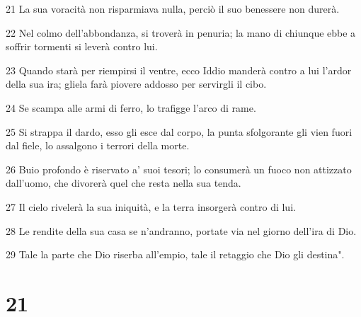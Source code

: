 \par 21 La sua voracità non risparmiava nulla, perciò il suo benessere non durerà.
\par 22 Nel colmo dell'abbondanza, si troverà in penuria; la mano di chiunque ebbe a soffrir tormenti si leverà contro lui.
\par 23 Quando starà per riempirsi il ventre, ecco Iddio manderà contro a lui l'ardor della sua ira; gliela farà piovere addosso per servirgli il cibo.
\par 24 Se scampa alle armi di ferro, lo trafigge l'arco di rame.
\par 25 Si strappa il dardo, esso gli esce dal corpo, la punta sfolgorante gli vien fuori dal fiele, lo assalgono i terrori della morte.
\par 26 Buio profondo è riservato a' suoi tesori; lo consumerà un fuoco non attizzato dall'uomo, che divorerà quel che resta nella sua tenda.
\par 27 Il cielo rivelerà la sua iniquità, e la terra insorgerà contro di lui.
\par 28 Le rendite della sua casa se n'andranno, portate via nel giorno dell'ira di Dio.
\par 29 Tale la parte che Dio riserba all'empio, tale il retaggio che Dio gli destina".

\chapter{21}


